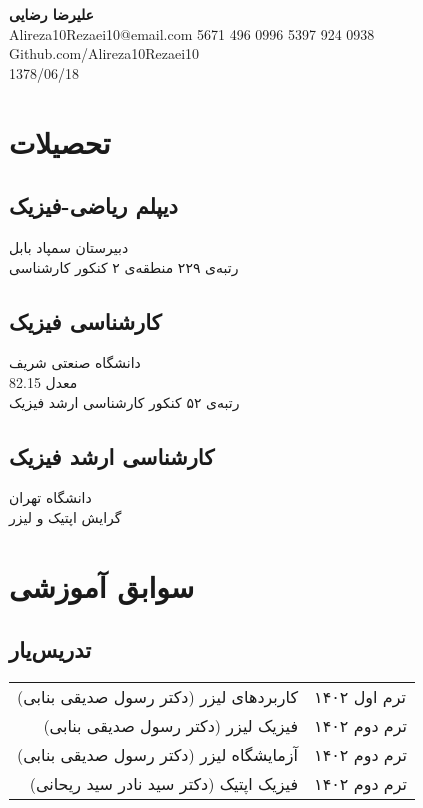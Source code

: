 \documentclass{persian-resume}
\begin{document}
\begin{center}
  {\Huge \textbf{
    علیرضا رضایی
  }} \\
  \vspace{1.5em}
  Alireza10Rezaei10@email.com \hspace{1cm} 5671 496 0996 \hspace{1cm} 5397 924 0938\\
  \vspace{1em}
  Github.com/Alireza10Rezaei10\\
  \vspace{1em}
    1378/06/18
\end{center}

\section{تحصیلات}
\subsection*{دیپلم ریاضی-فیزیک}
دبیرستان سمپاد بابل\\
رتبه‌ی ۲۲۹ منطقه‌ی ۲ کنکور کارشناسی

\subsection*{
کارشناسی فیزیک
}
دانشگاه صنعتی شریف\\
معدل 82.15\\
رتبه‌ی ۵۲ کنکور کارشناسی ارشد فیزیک

\subsection*{
کارشناسی ارشد فیزیک
}
دانشگاه تهران\\
گرایش اپتیک و لیزر

\section{
    سوابق آموزشی
}
\subsection*{
تدریس‌یار
}
\begin{tabular*}{\textwidth}{@{\extracolsep{\fill}} rl}
کاربردهای لیزر (دکتر رسول صدیقی بنابی) & ترم اول ۱۴۰۲ \\
فیزیک لیزر (دکتر رسول صدیقی بنابی) & ترم دوم ۱۴۰۲  \\
آزمایشگاه لیزر (دکتر رسول صدیقی بنابی) & ترم دوم ۱۴۰۲  \\
فیزیک اپتیک (دکتر سید نادر سید ریحانی) & ترم دوم ۱۴۰۲  \\
\end{tabular*}
\end{document}
